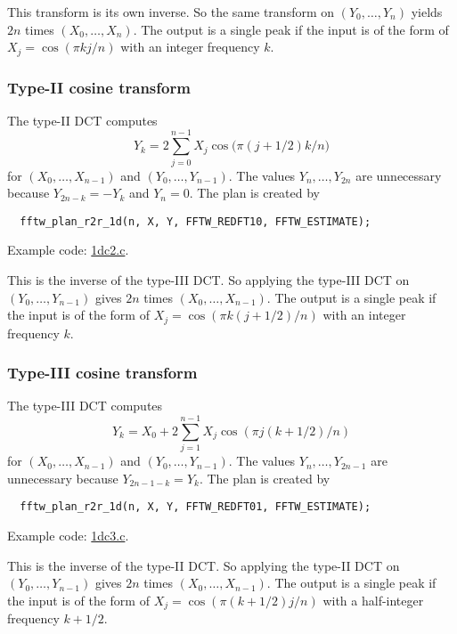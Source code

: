 \documentclass[12pt]{article}
\begin{document}
This transform is its own inverse.
%
So the same transform on $(Y_0, \dots, Y_n)$
  yields $2n$ times $(X_0, \dots, X_n)$.
%
The output is a single peak if the input is of the form of
  $X_j = \cos(\pi k j/n)$
  with an integer frequency $k$.





\subsubsection{Type-II cosine transform}
The type-II DCT computes
\begin{equation}
  Y_k = 2 \sum_{j = 0}^{n - 1} X_j \cos\big(  \pi (j + 1/2) k / n  \big)
\end{equation}
%
for $(X_0, \dots, X_{n-1})$ and $(Y_0, \dots, Y_{n-1})$.
%
The values $Y_{n}, \dots, Y_{2n}$ are unnecessary because
$Y_{2n - k} = -Y_k$
and
$Y_n = 0$.
%
The plan is created by
\begin{verbatim}
  fftw_plan_r2r_1d(n, X, Y, FFTW_REDFT10, FFTW_ESTIMATE);
\end{verbatim}
Example code: \url{1dc2.c}.

This is the inverse of the type-III DCT.
%
So applying the type-III DCT on $(Y_0, \dots, Y_{n-1})$
  gives $2n$ times $(X_0, \dots, X_{n - 1})$.
%
The output is a single peak if the input is of the form of
  $X_j = \cos(\pi k (j + 1/2)/n)$
  with an integer frequency $k$.





\subsubsection{Type-III cosine transform}
The type-III DCT computes
\begin{equation}
  Y_k = X_0 + 2 \sum_{j = 1}^{n - 1} X_j \cos(\pi j (k + 1/2) / n)
\end{equation}
%
for $(X_0, \dots, X_{n-1})$ and $(Y_0, \dots, Y_{n-1})$.
%
The values $Y_{n}, \dots, Y_{2n - 1}$ are unnecessary because
$Y_{2n - 1 - k} = Y_k$.
%
The plan is created by
\begin{verbatim}
  fftw_plan_r2r_1d(n, X, Y, FFTW_REDFT01, FFTW_ESTIMATE);
\end{verbatim}
Example code: \url{1dc3.c}.

This is the inverse of the type-II DCT.
%
So applying the type-II DCT on $(Y_0, \dots, Y_{n-1})$
  gives $2n$ times $(X_0, \dots, X_{n - 1})$.
%
The output is a single peak if the input is of the form of
  $X_j = \cos(\pi (k + 1/2) j/n)$
  with a half-integer frequency $k + 1/2$.
\end{document}
